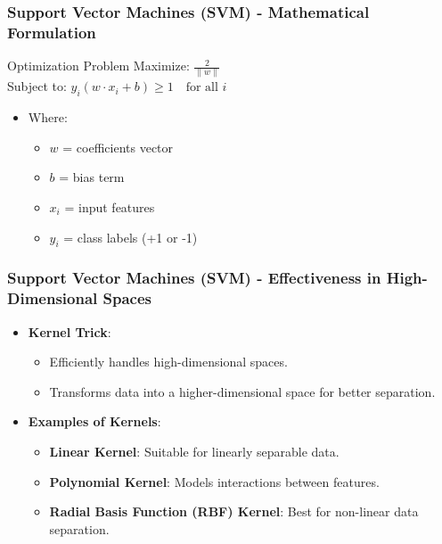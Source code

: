 \documentclass[aspectratio=169]{beamer}
\begin{document}
\begin{frame}[fragile]
    \frametitle{Support Vector Machines (SVM) - Mathematical Formulation}
    \begin{block}{Optimization Problem}
        Maximize: \( \frac{2}{\|w\|} \) \\
        Subject to: \( y_i (w \cdot x_i + b) \geq 1 \quad \text{for all } i \)
    \end{block}
    \begin{itemize}
        \item Where:
            \begin{itemize}
                \item \( w \) = coefficients vector
                \item \( b \) = bias term
                \item \( x_i \) = input features
                \item \( y_i \) = class labels (+1 or -1)
            \end{itemize}
    \end{itemize}
\end{frame}

\begin{frame}
    \frametitle{Support Vector Machines (SVM) - Effectiveness in High-Dimensional Spaces}
    \begin{itemize}
        \item \textbf{Kernel Trick}:
            \begin{itemize}
                \item Efficiently handles high-dimensional spaces.
                \item Transforms data into a higher-dimensional space for better separation.
            \end{itemize}
        \item \textbf{Examples of Kernels}:
            \begin{itemize}
                \item \textbf{Linear Kernel}: Suitable for linearly separable data.
                \item \textbf{Polynomial Kernel}: Models interactions between features.
                \item \textbf{Radial Basis Function (RBF) Kernel}: Best for non-linear data separation.
            \end{itemize}
    \end{itemize}
\end{frame}
\end{document}
